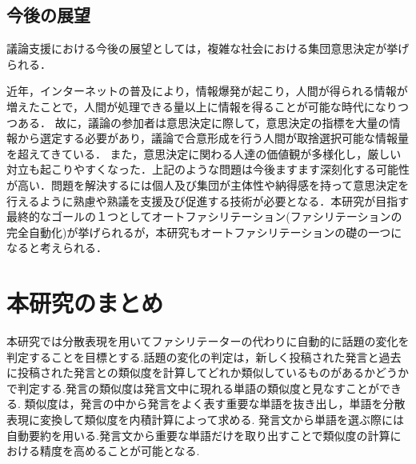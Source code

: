 \subsection{今後の展望}
\label{con:future}
議論支援における今後の展望としては，複雑な社会における集団意思決定が挙げられる．

近年，インターネットの普及により，情報爆発が起こり，人間が得られる情報が増えたことで，人間が処理できる量以上に情報を得ることが可能な時代になりつつある．
故に，議論の参加者は意思決定に際して，意思決定の指標を大量の情報から選定する必要があり，議論で合意形成を行う人間が取捨選択可能な情報量を超えてきている．
また，意思決定に関わる人達の価値観が多様化し，厳しい対立も起こりやすくなった．上記のような問題は今後ますます深刻化する可能性が高い．問題を解決するには個人及び集団が主体性や納得感を持って意思決定を行えるように熟慮や熟議を支援及び促進する技術が必要となる．本研究が目指す最終的なゴールの１つとしてオートファシリテーション(ファシリテーションの完全自動化)が挙げられるが，本研究もオートファシリテーションの礎の一つになると考えられる．

\section{本研究のまとめ}
\label{con:conclusion}
本研究では分散表現を用いてファシリテーターの代わりに自動的に話題の変化を判定することを目標とする.話題の変化の判定は，新しく投稿された発言と過去に投稿された発言との類似度を計算してどれか類似しているものがあるかどうかで判定する.発言の類似度は発言文中に現れる単語の類似度と見なすことができる.
類似度は，発言の中から発言をよく表す重要な単語を抜き出し，単語を分散表現に変換して類似度を内積計算によって求める.
 発言文から単語を選ぶ際には自動要約を用いる.発言文から重要な単語だけを取り出すことで類似度の計算における精度を高めることが可能となる.
 
